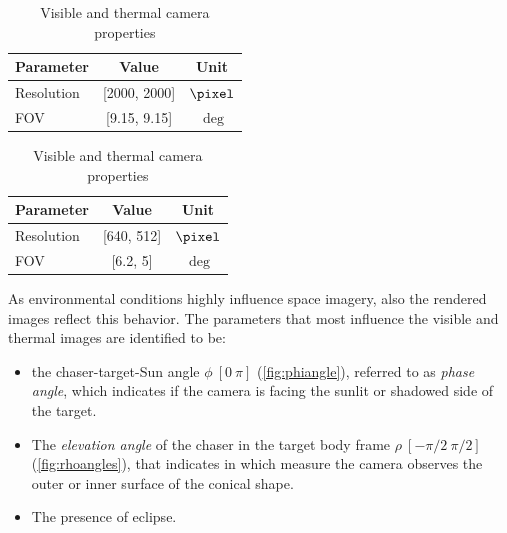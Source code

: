 \begin{table}[!h]
    \begin{subtable}[h]{0.45\textwidth}
        \centering
        \begin{tabular}{l c c}
        Parameter & Value & Unit \\
        \hline \hline
        Resolution & [2000, 2000] & $\SI{}{\pixel}$ \\\hline
        FOV & [9.15, 9.15] &  $\SI{}{\deg}$\\\hline


       \end{tabular}
       \caption{VIS camera properties}
       \label{tab:viscam}
    \end{subtable}
    \hfill
    \begin{subtable}[h]{0.45\textwidth}
        \centering
        \begin{tabular}{l c c}
        Parameter & Value & Unit \\
        \hline \hline
        Resolution & [640, 512] & $\SI{}{\pixel}$ \\\hline
        FOV & [6.2, 5] &  $\SI{}{\deg}$\\\hline

        \end{tabular}
        \caption{TIR camera properties}
        \label{tab:tircame}
     \end{subtable}
     \caption{Visible and thermal camera properties}
     \label{tab:cams}
\end{table}
As environmental conditions highly influence space imagery, also the rendered images reflect this behavior. The parameters that most influence the visible and thermal images are identified to be:
\begin{itemize}
    \item the chaser-target-Sun angle $\phi \ [0 \ \pi]$ (\cref{fig:phiangle}), referred to as \textit{phase angle}, which indicates if the camera is facing the sunlit or shadowed side of the target.
    \item The \textit{elevation angle} of the chaser in the target body frame $\rho \ [-\pi/2 \ \pi/2]$ (\cref{fig:rhoangles}), that indicates in which measure the camera observes the outer or inner surface of the conical shape.
    \item The presence of eclipse.
\end{itemize}
